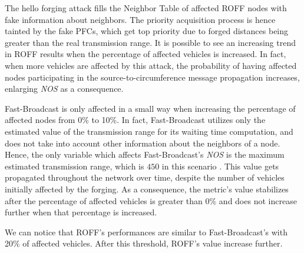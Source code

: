 			The hello forging attack fills the Neighbor Table of affected ROFF nodes with fake information about neighbors. The priority acquisition process is hence tainted by the fake PFCs, which get top priority due to forged distances being greater than the real transmission range. It is possible to see an increasing trend in ROFF results when the percentage of affected vehicles is increased. In fact, when more vehicles are affected by this attack, the probability of having affected nodes participating in the source-to-circumference message propagation increases, enlarging \textit{NOS} as a consequence.
			
			
			Fast-Broadcast is only affected in a small way when increasing the percentage of affected nodes from 0\% to 10\%. In fact, Fast-Broadcast utilizes only the estimated value of the transmission range for its waiting time computation, and does not take into account other information about the neighbors of a node. Hence, the only variable which affects Fast-Broadcast's \textit{NOS} is the maximum estimated transmission range, which is $450$ in this scenario . This value gets propagated throughout the network over time, despite the number of vehicles initially affected by the forging. As a consequence, the metric's value stabilizes after the percentage of affected vehicles is greater than 0\% and does not increase further when that percentage is increased.
			
			
			We can notice that ROFF's performances are similar to Fast-Broadcast's with 20\% of affected vehicles. After this threshold, ROFF's value increase further.
		
